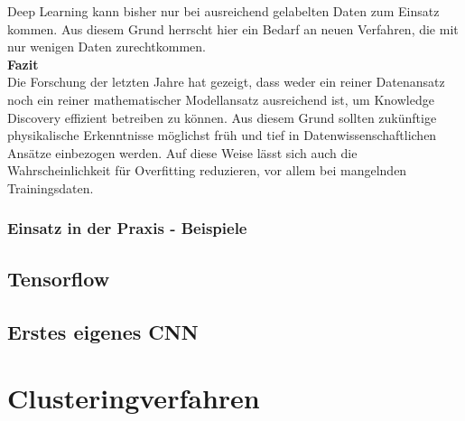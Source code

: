 \documentclass[11pt,fleqn]{book}
\begin{document}
\bigskip
Deep Learning kann bisher nur bei ausreichend gelabelten Daten zum Einsatz kommen. Aus diesem Grund herrscht hier ein Bedarf an neuen Verfahren, die mit nur wenigen Daten zurechtkommen.\\
\bigskip
\textbf{Fazit}\\
Die Forschung der letzten Jahre hat gezeigt, dass weder ein reiner Datenansatz noch ein reiner mathematischer Modellansatz ausreichend ist, um Knowledge Discovery effizient betreiben zu können. Aus diesem Grund sollten zukünftige physikalische Erkenntnisse möglichst früh und tief in Datenwissenschaftlichen Ansätze einbezogen werden. Auf diese Weise lässt sich auch die Wahrscheinlichkeit für Overfitting reduzieren, vor allem bei mangelnden Trainingsdaten.

\subsection{Einsatz in der Praxis - Beispiele}

\section{Tensorflow}

\section{Erstes eigenes CNN}


\chapter{Clusteringverfahren}
~
\end{document}
